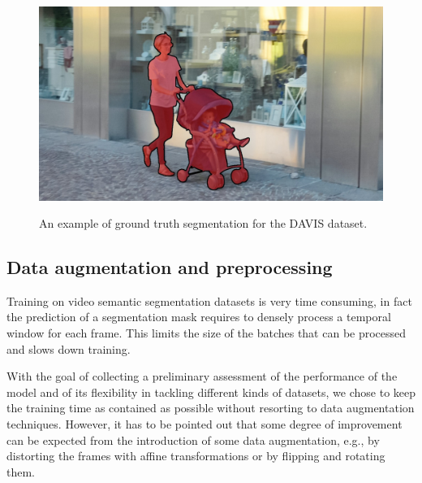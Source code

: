 \begin{figure}[t]
    \includegraphics[width=0.3\columnwidth]{img/deconvLSTM/davis_gt9.jpg}\\
    \caption{An example of ground truth segmentation for the DAVIS dataset.}
    \label{fig:deconvlstm_davis_gt}
\end{figure}




\subsection{Data augmentation and preprocessing}
Training on video semantic segmentation datasets is very time consuming, in
fact the prediction of a segmentation mask requires to densely process a
temporal window for each frame. This limits the size of the batches that can
be processed and slows down training.

With the goal of collecting a preliminary assessment of the performance of the
model and of its flexibility in tackling different kinds of datasets, we chose
to keep the training time as contained as possible without resorting to data
augmentation techniques. However, it has to be pointed out that some degree of
improvement can be expected from the introduction of some data augmentation,
e.g., by distorting the frames with affine transformations or by flipping and
rotating them.

